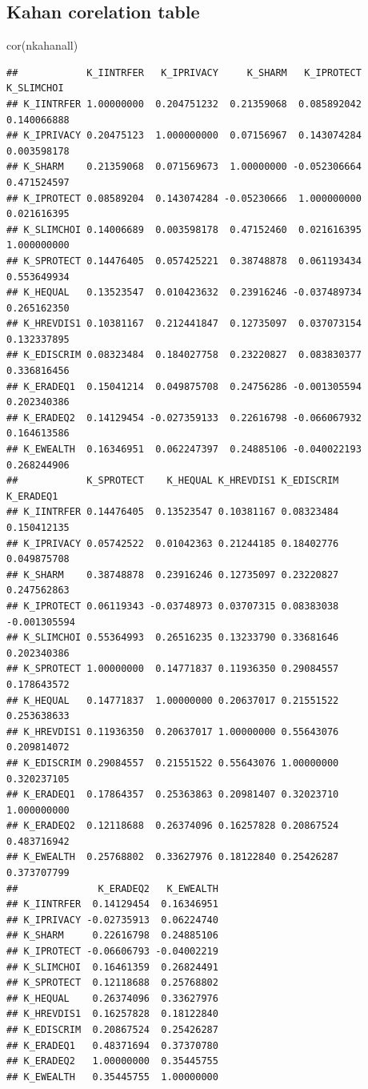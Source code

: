 \documentclass[
]{article}
\newenvironment{Shaded}{\begin{snugshade}}{\end{snugshade}}
\newcommand{\FunctionTok}[1]{\textcolor[rgb]{0.00,0.00,0.00}{#1}}
\newcommand{\NormalTok}[1]{#1}
\begin{document}
\hypertarget{kahan-corelation-table}{%
\subsection{Kahan corelation table}\label{kahan-corelation-table}}

\begin{Shaded}
\begin{Highlighting}[]
\FunctionTok{cor}\NormalTok{(nkahanall)}
\end{Highlighting}
\end{Shaded}

\begin{verbatim}
##            K_IINTRFER   K_IPRIVACY     K_SHARM   K_IPROTECT  K_SLIMCHOI
## K_IINTRFER 1.00000000  0.204751232  0.21359068  0.085892042 0.140066888
## K_IPRIVACY 0.20475123  1.000000000  0.07156967  0.143074284 0.003598178
## K_SHARM    0.21359068  0.071569673  1.00000000 -0.052306664 0.471524597
## K_IPROTECT 0.08589204  0.143074284 -0.05230666  1.000000000 0.021616395
## K_SLIMCHOI 0.14006689  0.003598178  0.47152460  0.021616395 1.000000000
## K_SPROTECT 0.14476405  0.057425221  0.38748878  0.061193434 0.553649934
## K_HEQUAL   0.13523547  0.010423632  0.23916246 -0.037489734 0.265162350
## K_HREVDIS1 0.10381167  0.212441847  0.12735097  0.037073154 0.132337895
## K_EDISCRIM 0.08323484  0.184027758  0.23220827  0.083830377 0.336816456
## K_ERADEQ1  0.15041214  0.049875708  0.24756286 -0.001305594 0.202340386
## K_ERADEQ2  0.14129454 -0.027359133  0.22616798 -0.066067932 0.164613586
## K_EWEALTH  0.16346951  0.062247397  0.24885106 -0.040022193 0.268244906
##            K_SPROTECT    K_HEQUAL K_HREVDIS1 K_EDISCRIM    K_ERADEQ1
## K_IINTRFER 0.14476405  0.13523547 0.10381167 0.08323484  0.150412135
## K_IPRIVACY 0.05742522  0.01042363 0.21244185 0.18402776  0.049875708
## K_SHARM    0.38748878  0.23916246 0.12735097 0.23220827  0.247562863
## K_IPROTECT 0.06119343 -0.03748973 0.03707315 0.08383038 -0.001305594
## K_SLIMCHOI 0.55364993  0.26516235 0.13233790 0.33681646  0.202340386
## K_SPROTECT 1.00000000  0.14771837 0.11936350 0.29084557  0.178643572
## K_HEQUAL   0.14771837  1.00000000 0.20637017 0.21551522  0.253638633
## K_HREVDIS1 0.11936350  0.20637017 1.00000000 0.55643076  0.209814072
## K_EDISCRIM 0.29084557  0.21551522 0.55643076 1.00000000  0.320237105
## K_ERADEQ1  0.17864357  0.25363863 0.20981407 0.32023710  1.000000000
## K_ERADEQ2  0.12118688  0.26374096 0.16257828 0.20867524  0.483716942
## K_EWEALTH  0.25768802  0.33627976 0.18122840 0.25426287  0.373707799
##              K_ERADEQ2   K_EWEALTH
## K_IINTRFER  0.14129454  0.16346951
## K_IPRIVACY -0.02735913  0.06224740
## K_SHARM     0.22616798  0.24885106
## K_IPROTECT -0.06606793 -0.04002219
## K_SLIMCHOI  0.16461359  0.26824491
## K_SPROTECT  0.12118688  0.25768802
## K_HEQUAL    0.26374096  0.33627976
## K_HREVDIS1  0.16257828  0.18122840
## K_EDISCRIM  0.20867524  0.25426287
## K_ERADEQ1   0.48371694  0.37370780
## K_ERADEQ2   1.00000000  0.35445755
## K_EWEALTH   0.35445755  1.00000000
\end{verbatim}
\end{document}
